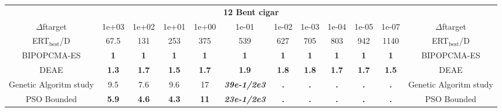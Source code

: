 \begin{tabular}{cccccccccccc}
 & \multicolumn{10}{c}{{\normalsize \textbf{12 Bent cigar}}}\\
$\Delta$ftarget& 1e+03& 1e+02& 1e+01& 1e+00& 1e-01& 1e-02& 1e-03& 1e-04& 1e-05& 1e-07 & $\Delta$ftarget \\
ERT$_{\textrm{best}}$/D& 67.5& 131& 253& 375& 539& 627& 705& 803& 942& 1140 & ERT$_{\textrm{best}}$/D \\
\hline
BIPOPCMA-ES & \textbf{1} & \textbf{1} & \textbf{1} & \textbf{1} & \textbf{1} & \textbf{1} & \textbf{1} & \textbf{1} & \textbf{1} & \textbf{1} & BIPOPCMA-ES \cite{add_an_entry_for_BIPOPCMA-ES_in_bbob.bib}\\
DEAE & \textbf{1.3} & \textbf{1.7} & \textbf{1.5} & \textbf{1.7} & \textbf{1.9} & \textbf{1.8} & \textbf{1.8} & \textbf{1.7} & \textbf{1.7} & \textbf{1.5} & DEAE \cite{add_an_entry_for_DEAE_in_bbob.bib}\\
Genetic Algoritm study & 9.5 & 7.6 & 9.6 & 17 & \textbf{\textit{39e-1}\textit{/2e3}} & \textbf{.} & \textbf{.} & \textbf{.} & \textbf{.} & \textbf{.} & Genetic Algoritm study \cite{add_an_entry_for_Genetic Algoritm study_in_bbob.bib}\\
PSO Bounded & \textbf{5.9} & \textbf{4.6} & \textbf{4.3} & \textbf{11} & \textbf{\textit{23e-1}\textit{/2e3}} & \textbf{.} & \textbf{.} & \textbf{.} & \textbf{.} & \textbf{.} & PSO Bounded \cite{add_an_entry_for_PSO Bounded_in_bbob.bib}
\end{tabular}
